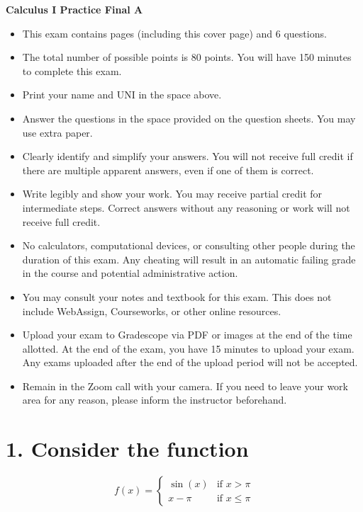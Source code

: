 \documentclass[12pt]{article}
\begin{document}
\begin{center}
    \Large\textbf{Calculus I Practice Final A}
\end{center}
\vspace{1cm}

\begin{itemize}
    \item This exam contains \pageref{LastPage} pages (including this cover page) and 6 questions.
    \item The total number of possible points is 80 points. You will have 150 minutes to complete this exam.
    \item Print your name and UNI in the space above.
    \item Answer the questions in the space provided on the question sheets. You may use extra paper.
    \item Clearly identify and simplify your answers. You will not receive full credit if there are multiple apparent answers, even if one of them is correct.
    \item Write legibly and show your work. You may receive partial credit for intermediate steps. Correct answers without any reasoning or work will not receive full credit.
    \item No calculators, computational devices, or consulting other people during the duration of this exam. Any cheating will result in an automatic failing grade in the course and potential administrative action.
    \item You may consult your notes and textbook for this exam. This does not include WebAssign, Courseworks, or other online resources.
    \item Upload your exam to Gradescope via PDF or images at the end of the time allotted. At the end of the exam, you have 15 minutes to upload your exam. Any exams uploaded after the end of the upload period will not be accepted.
    \item Remain in the Zoom call with your camera. If you need to leave your work area for any reason, please inform the instructor beforehand.
\end{itemize}
\newpage
\section*{1. Consider the function}
\[ f(x)=\begin{cases} \sin(x) & \text{if } x > \pi \\ x-\pi & \text{if } x \le \pi \end{cases} \]
\end{document}
